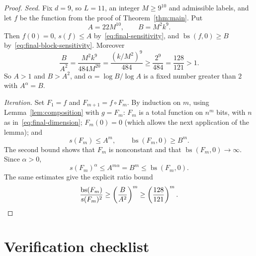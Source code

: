 \documentclass[11pt]{article}
\newcommand{\bs}{\operatorname{bs}}
\theoremstyle{definition}
\theoremstyle{remark}
\begin{document}
\begin{proof}
\emph{Seed.} Fix $d=9$, so $L=11$, an integer $M\ge9^{10}$ and admissible
labels, and let $f$ be the function from the proof of
Theorem~\ref{thm:main}. Put
\[
 A=22M^{10},\qquad B=M^2k^9.
\]
Then $f(0)=0$, $s(f)\le A$ by~\eqref{eq:final-sensitivity}, and
$\bs(f,0)\ge B$ by~\eqref{eq:final-block-sensitivity}. Moreover
\[
 \frac{B}{A^2}
   =\frac{M^2k^9}{484M^{20}}
   =\frac{(k/M^2)^9}{484}
   \geq\frac{2^9}{484}
   =\frac{128}{121}>1.
\]
So $A>1$ and $B>A^2$, and $\alpha=\log B/\log A$ is a fixed number greater
than $2$ with $A^\alpha=B$.

\emph{Iteration.} Set $F_1=f$ and $F_{m+1}=f\circ F_m$. By induction on $m$,
using Lemma~\ref{lem:composition} with $g=F_m$: $F_m$ is a total function on
$n^m$ bits, with $n$ as in~\eqref{eq:final-dimension}; $F_m(0)=0$ (which
allows the next application of the lemma); and
\[
 s(F_m)\leq A^m,
 \qquad
 \bs(F_m,0)\geq B^m.
\]
The second bound shows that $F_m$ is nonconstant and that
$\bs(F_m,0)\to\infty$. Since $\alpha>0$,
\[
 s(F_m)^\alpha\leq A^{m\alpha}=B^m\leq\bs(F_m,0).
\]
The same estimates give the explicit ratio bound
\[
 \frac{\bs(F_m)}{s(F_m)^2}
 \geq\left(\frac{B}{A^2}\right)^m
 \geq\left(\frac{128}{121}\right)^m.\qedhere
\]
\end{proof}

\section{Verification checklist}
\end{document}

